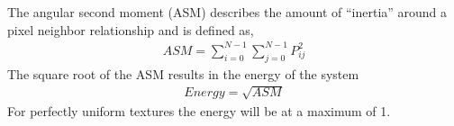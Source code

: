 The angular second moment (ASM) describes the amount of “inertia” around a pixel neighbor relationship and is defined as,
%
\begin{align}
    ASM = \sum_{i=0}^{N-1}\sum_{j=0}^{N-1}P_{ij}^2
\end{align}
%
The square root of the ASM results in the energy of the system
%
\begin{align}
    Energy = \sqrt{ASM}
\end{align}
%
For perfectly uniform textures the energy will be at a maximum of 1.

